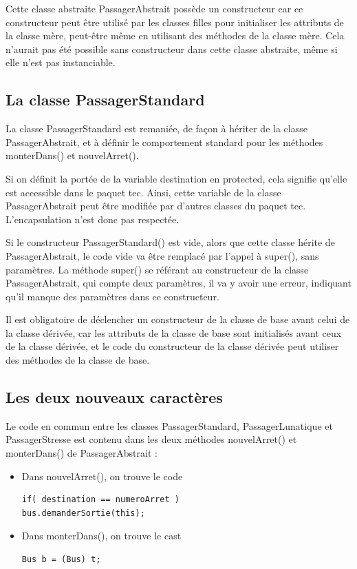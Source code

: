 \documentclass[a4paper,11pt]{article}
\begin{document}
Cette classe abstraite PassagerAbstrait possède un constructeur car ce constructeur peut être utilisé par les classes filles pour initialiser les attributs de la classe mère, peut-être même en utilisant des méthodes de la classe mère. Cela n'aurait pas été possible sans constructeur dans cette classe abstraite, même si elle n'est pas instanciable.

\subsection{La classe PassagerStandard}
La classe PassagerStandard est remaniée, de façon à hériter de la classe PassagerAbstrait, et à définir le comportement standard pour les méthodes monterDans() et nouvelArret().

Si on définit la portée de la variable destination en protected, cela signifie qu'elle est accessible dans le paquet tec. Ainsi, cette variable de la classe PassagerAbstrait peut être modifiée par d'autres classes du paquet tec. L'encapsulation n'est donc pas respectée.

Si le constructeur PassagerStandard() est vide, alors que cette classe hérite de PassagerAbstrait, le code vide va être remplacé par l'appel à super(), sans paramètres. La méthode super() se référant au constructeur de la classe PassagerAbstrait, qui compte deux paramètres, il va y avoir une erreur, indiquant qu'il manque des paramètres dans ce constructeur.

Il est obligatoire de déclencher un constructeur de la classe de base avant celui de la classe dérivée, car les attributs de la classe de base sont initialisés avant ceux de la classe dérivée, et le code du constructeur de la classe dérivée peut utiliser des méthodes de la classe de base.

\subsection{Les deux nouveaux caractères}
Le code en commun entre les classes PassagerStandard, PassagerLunatique et PassagerStresse est contenu dans les deux méthodes nouvelArret() et monterDans() de PassagerAbstrait :
\begin{itemize}
\item Dans nouvelArret(), on trouve le code
\begin{verbatim}
if( destination == numeroArret )
bus.demanderSortie(this);
\end{verbatim}
\item Dans monterDans(), on trouve le cast
\begin{verbatim}
Bus b = (Bus) t;
\end{verbatim}
\end{itemize}
\end{document}
